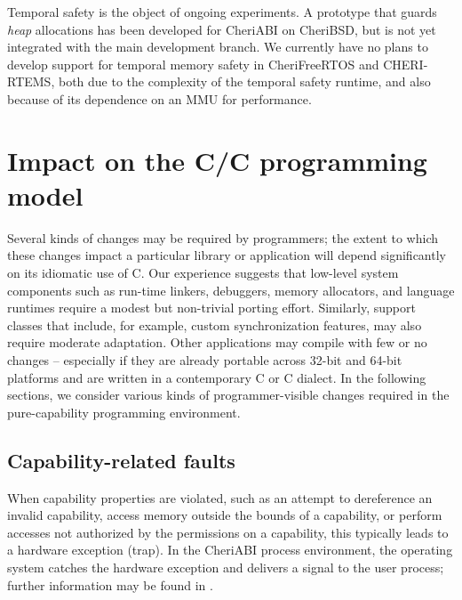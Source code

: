 \documentclass[12pt,twoside,openright,usletter]{article}
\newcommand{\ccode}[1]{{\small\ttfamily{#1}}}
\newcommand{\SIGPROT}{{\ccode{SIGPROT}}\xspace}
\newcommand{\note}[2]{{\color{blue}[ Note: #1 - #2]}}
\renewcommand{\note}[2]{\relax\ifhmode\unskip\fi}
\newcommand{\rwnote}[1]{\note{#1}{Robert W.}}
\newcommand*{\cpp}[1][]{C\textsmaller[2]{\nolinebreak[4]\hspace{-.05em}\raisebox{.45ex}{\textbf{++}}}}
\newcommand*{\cppInHeader}[1][]{\texorpdfstring{\cpp{}}{C++}}
\begin{document}

\noindent
Temporal safety is the object of ongoing experiments.
A prototype that guards \emph{heap} allocations has been developed for
CheriABI on CheriBSD, but is not yet integrated with the main development
branch.
We currently have no plans to develop support for temporal memory safety in
CheriFreeRTOS and CHERI-RTEMS, both due to the complexity of the temporal
safety runtime, and also because of its dependence on an MMU for performance.

%

\section{Impact on the C/\cppInHeader{} programming model}
Several kinds of changes may be required by programmers; the extent to which
these changes impact a particular library or application will depend
significantly on its idiomatic use of C.
Our experience suggests that low-level system components such as run-time
linkers, debuggers, memory allocators, and language runtimes require a modest
but non-trivial porting effort.
Similarly, support classes that include, for example, custom synchronization
features, may also require moderate adaptation.
Other applications may compile with few or no changes -- especially if they
are already portable across 32-bit and 64-bit platforms and are written in a contemporary C or \cpp{} dialect.
In the following sections, we consider various kinds of programmer-visible
changes required in the pure-capability programming environment.

\subsection{Capability-related faults}
\label{sec:faults}

When capability properties are violated, such as an attempt to dereference an
invalid capability, access memory outside the bounds of a capability, or perform
accesses not authorized by the permissions on a capability, this typically
leads to a hardware exception (trap).
In the CheriABI process environment, the operating system catches the hardware
exception and delivers a \SIGPROT signal to the user process;
further information may be found in .
\end{document}
